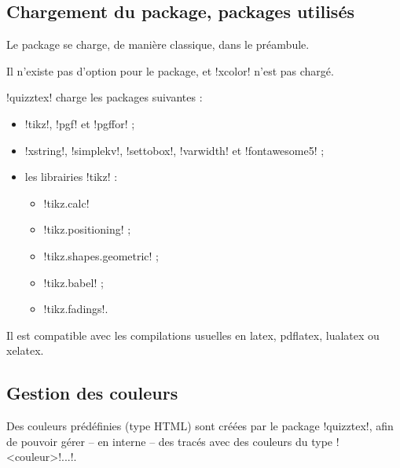 \documentclass[french,a4paper,11pt]{article}
\begin{document}
\subsection{Chargement du package, packages utilisés}

\begin{importantblock}
Le package se charge, de manière classique, dans le préambule.

Il n'existe pas d'option pour le package, et \packagetex!xcolor! n'est pas chargé.
\end{importantblock}


\begin{noteblock}
\packagetex!quizztex! charge les packages suivantes :

\begin{itemize}
	\item \packagetex!tikz!, \packagetex!pgf! et \packagetex!pgffor! ;
	\item \packagetex!xstring!, \packagetex!simplekv!, \packagetex!settobox!, \packagetex!varwidth! et \packagetex!fontawesome5! ;
	\item les librairies \packagetex!tikz! :
	\begin{itemize}
		\item \packagetex!tikz.calc!
		\item \packagetex!tikz.positioning! ;
		\item \packagetex!tikz.shapes.geometric! ;
		\item \packagetex!tikz.babel! ;
		\item \packagetex!tikz.fadings!.
	\end{itemize}
\end{itemize}

Il est compatible avec les compilations usuelles en \textsf{latex}, \textsf{pdflatex}, \textsf{lualatex} ou \textsf{xelatex}.
\end{noteblock}

\subsection{Gestion des couleurs}

\begin{tipblock}
Des couleurs prédéfinies (type \textsf{HTML}) sont créées par le package \packagetex!quizztex!, afin de pouvoir gérer -- en interne -- des tracés avec des couleurs du type \motcletex!<couleur>!...!.
\end{tipblock}
\end{document}
